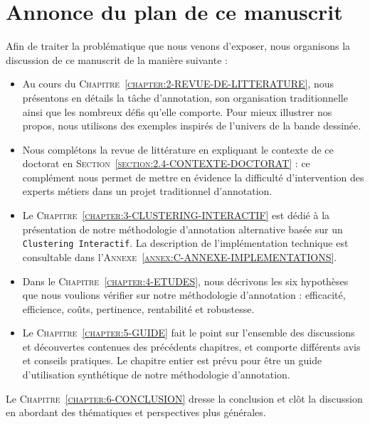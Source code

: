 		
		
	\section*{Annonce du plan de ce manuscrit}
		
		Afin de traiter la problématique que nous venons d'exposer, nous organisons la discussion de ce manuscrit de la manière suivante :
		
		\begin{itemize}
			\item Au cours du \textsc{Chapitre~\ref{chapter:2-REVUE-DE-LITTERATURE}}, nous présentons en détails la tâche d'annotation, son organisation traditionnelle ainsi que les nombreux défis qu'elle comporte.
			Pour mieux illustrer nos propos, nous utilisons des exemples inspirés de l'univers de la bande dessinée.
			\item Nous complétons la revue de littérature en expliquant le contexte de ce doctorat en \textsc{Section~\ref{section:2.4-CONTEXTE-DOCTORAT}} : ce complément nous permet de mettre en évidence la difficulté d'intervention des experts métiers dans un projet traditionnel d'annotation.
			\item Le \textsc{Chapitre~\ref{chapter:3-CLUSTERING-INTERACTIF}} est dédié à la présentation de notre méthodologie d'annotation alternative basée sur un \texttt{Clustering Interactif}.
			La description de l'implémentation technique est consultable dans l'\textsc{Annexe~\ref{annex:C-ANNEXE-IMPLEMENTATIONS}}.
			\item Dans le \textsc{Chapitre~\ref{chapter:4-ETUDES}}, nous décrivons les six hypothèses que nous voulions vérifier sur notre méthodologie d'annotation : efficacité, efficience, coûts, pertinence, rentabilité et robustesse.
			\item Le \textsc{Chapitre~\ref{chapter:5-GUIDE}} fait le point sur l'ensemble des discussions et découvertes contenues des précédents chapitres, et comporte différents avis et conseils pratiques.
			Le chapitre entier est prévu pour être un guide d'utilisation synthétique de notre méthodologie d'annotation.
		\end{itemize}
		
		Le \textsc{Chapitre~\ref{chapter:6-CONCLUSION}} dresse la conclusion et clôt la discussion en abordant des thématiques et perspectives plus générales.
